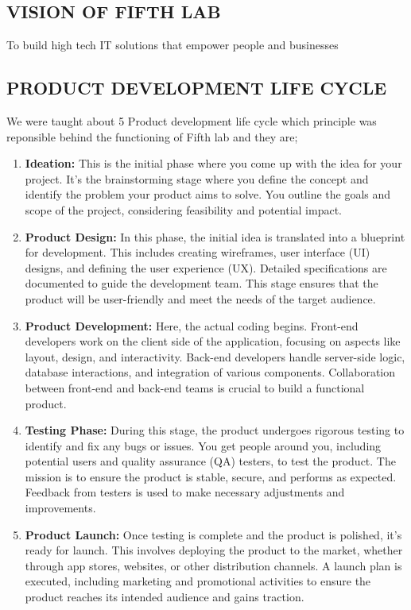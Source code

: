 \documentclass[a4paper,12pt]{report}
\begin{document}
\subsection[Fifth lab Vision]{VISION OF FIFTH LAB}
To build high tech IT solutions that empower people and businesses

\subsection[PDLC]{PRODUCT DEVELOPMENT LIFE CYCLE}
We were taught about 5 Product development life cycle which principle was reponsible behind the functioning of Fifth lab and they are;
\begin{enumerate}
    \item \textbf{Ideation: }This is the initial phase where you come up with the idea for your project. It's the brainstorming stage where you define the concept and identify the problem your product aims to solve. You outline the goals and scope of the project, considering feasibility and potential impact.
    \item \textbf{Product Design: }In this phase, the initial idea is translated into a blueprint for development. This includes creating wireframes, user interface (UI) designs, and defining the user experience (UX). Detailed specifications are documented to guide the development team. This stage ensures that the product will be user-friendly and meet the needs of the target audience.
    \item \textbf{Product Development: }Here, the actual coding begins. Front-end developers work on the client side of the application, focusing on aspects like layout, design, and interactivity. Back-end developers handle server-side logic, database interactions, and integration of various components. Collaboration between front-end and back-end teams is crucial to build a functional product.
    \item \textbf{Testing Phase: }During this stage, the product undergoes rigorous testing to identify and fix any bugs or issues. You get people around you, including potential users and quality assurance (QA) testers, to test the product. The mission is to ensure the product is stable, secure, and performs as expected. Feedback from testers is used to make necessary adjustments and improvements.
    \item \textbf{Product Launch: }Once testing is complete and the product is polished, it's ready for launch. This involves deploying the product to the market, whether through app stores, websites, or other distribution channels. A launch plan is executed, including marketing and promotional activities to ensure the product reaches its intended audience and gains traction.
\end{enumerate}
\end{document}
